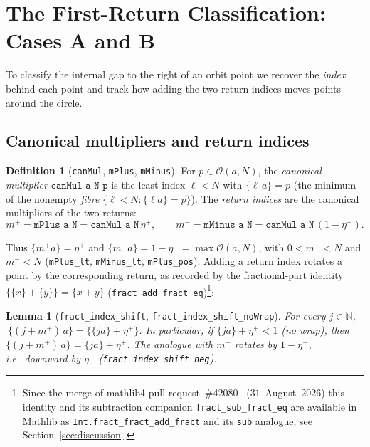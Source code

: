 \documentclass[11pt,reqno]{amsart}
\theoremstyle{plain}
\newtheorem{lemma}[theorem]{Lemma}
\theoremstyle{definition}
\newtheorem{definition}[theorem]{Definition}
\theoremstyle{remark}
\newcommand{\N}{\mathbb{N}}
\newcommand{\fract}[1]{\{#1\}}
\newcommand{\etap}{\eta^{+}}
\newcommand{\etam}{\eta^{-}}
\newcommand{\mpl}{m^{+}}
\newcommand{\mmi}{m^{-}}
\newcommand{\orb}{\mathcal{O}}
\newcommand{\code}[1]{\texttt{#1}}
\begin{document}
\section{The First-Return Classification: Cases A and B}\label{sec:cases}

To classify the internal gap to the right of an orbit point we recover the
\emph{index} behind each point and track how adding the two return indices moves
points around the circle.

\subsection{Canonical multipliers and return indices}

\begin{definition}[\code{canMul}, \code{mPlus}, \code{mMinus}]
For $p\in\orb(a,N)$, the \emph{canonical multiplier} $\code{canMul a N p}$ is the
least index $\ell<N$ with $\fract{\ell\,a}=p$ (the minimum of the nonempty
\emph{fibre} $\{\ell<N : \fract{\ell a}=p\}$).  The \emph{return indices} are the
canonical multipliers of the two returns:
\[
  \mpl = \code{mPlus a N} = \code{canMul a N}\,\etap,
  \qquad
  \mmi = \code{mMinus a N} = \code{canMul a N}\,(1-\etam).
\]
\end{definition}

Thus $\fract{\mpl a}=\etap$ and $\fract{\mmi a}=1-\etam=\max\orb(a,N)$, with
$0<\mpl<N$ and $\mmi<N$ (\code{mPlus\_lt}, \code{mMinus\_lt},
\code{mPlus\_pos}).  Adding a return index rotates a point by the corresponding
return, as recorded by the fractional-part identity $\fract{\fract{x}+\fract{y}}
=\fract{x+y}$
(\code{fract\_add\_fract\_eq})\footnote{Since the merge of mathlib4 pull
request~\#42080~\cite{KunertMathlib2026} ($31$~August~$2026$) this identity
and its subtraction companion \code{fract\_sub\_fract\_eq} are available in
Mathlib as \code{Int.fract\_fract\_add\_fract} and its \code{sub} analogue;
see Section~\ref{sec:discussion}.}:

\begin{lemma}[\code{fract\_index\_shift}, \code{fract\_index\_shift\_noWrap}]
\label{lem:shift}
For every $j\in\N$, $\ \fract{(j+\mpl)\,a} = \fract{\fract{j a}+\etap}$.  In
particular, if $\fract{j a}+\etap<1$ (no wrap), then
$\fract{(j+\mpl)\,a}=\fract{j a}+\etap$.  The analogue with $\mmi$ rotates by
$1-\etam$, i.e.\ downward by $\etam$ (\code{fract\_index\_shift\_neg}).
\end{lemma}
\end{document}
